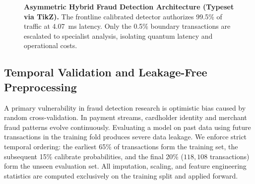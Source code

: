 \documentclass[10pt,a4paper]{article}
\begin{document}
\begin{figure}[h!]
\vspace{-4pt}
\caption{\textbf{Asymmetric Hybrid Fraud Detection Architecture (Typeset via TikZ).} The frontline calibrated detector authorizes 99.5\% of traffic at 4.07~ms latency. Only the 0.5\% boundary transactions are escalated to specialist analysis, isolating quantum latency and operational costs.}
\label{fig:arch}
\end{figure}
\vspace{-6pt}

\subsection{Temporal Validation and Leakage-Free Preprocessing}
A primary vulnerability in fraud detection research is optimistic bias caused by random cross-validation. In payment streams, cardholder identity and merchant fraud patterns evolve continuously. Evaluating a model on past data using future transactions in the training fold produces severe data leakage. We enforce strict temporal ordering: the earliest 65\% of transactions form the training set, the subsequent 15\% calibrate probabilities, and the final 20\% ($118,108$ transactions) form the unseen evaluation set. All imputation, scaling, and feature engineering statistics are computed exclusively on the training split and applied forward.
\end{document}

